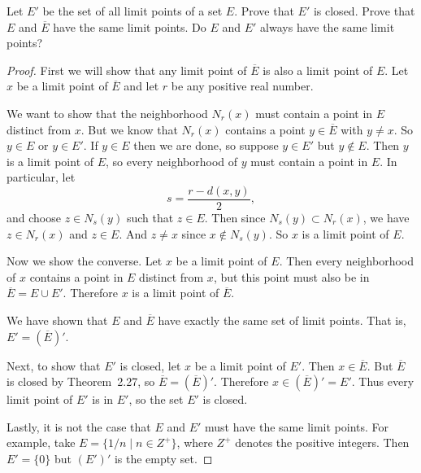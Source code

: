  Let $E'$ be the set of all limit points of a set $E$. Prove
that $E'$ is closed. Prove that $E$ and $\overline{E}$ have the same limit
points. Do $E$ and $E'$ always have the same limit points?
\begin{proof}
  First we will show that any limit point of $\overline{E}$ is also a
  limit point of $E$. Let $x$ be a limit point of $\overline{E}$ and
  let $r$ be any positive real number.

  We want to show that the neighborhood $N_r(x)$ must contain a point
  in $E$ distinct from $x$. But we know that $N_r(x)$ contains a point
  $y\in\overline{E}$ with $y\neq x$. So $y\in E$ or $y\in E'$. If
  $y\in E$ then we are done, so suppose $y\in E'$ but $y\not\in
  E$. Then $y$ is a limit point of $E$, so every neighborhood of $y$
  must contain a point in $E$. In particular, let
  \begin{equation*}
    s = \frac{r - d(x,y)}2,
  \end{equation*}
  and choose $z\in N_s(y)$ such that $z\in E$. Then since
  $N_s(y)\subset N_r(x)$, we have $z\in N_r(x)$ and $z\in E$. And
  $z\neq x$ since $x\not\in N_s(y)$. So $x$ is a limit point of $E$.

  Now we show the converse. Let $x$ be a limit point of $E$. Then
  every neighborhood of $x$ contains a point in $E$ distinct from $x$,
  but this point must also be in $\overline{E} = E\cup E'$. Therefore
  $x$ is a limit point of $\overline{E}$.

  We have shown that $E$ and $\overline{E}$ have exactly the same set
  of limit points. That is, $E' = (\overline{E})'$.

  Next, to show that $E'$ is closed, let $x$ be a limit point of
  $E'$. Then $x\in\overline{E}$. But $\overline{E}$ is closed by
  Theorem~2.27, so $\overline{E} = (\overline{E})'$. Therefore
  $x\in(\overline{E})' = E'$. Thus every limit point of $E'$ is in
  $E'$, so the set $E'$ is closed.

  Lastly, it is not the case that $E$ and $E'$ must have the same
  limit points. For example, take $E = \{ 1/n \mid n\in Z^+ \}$, where
  $Z^+$ denotes the positive integers. Then $E' = \{0\}$ but $(E')'$
  is the empty set.
\end{proof}
